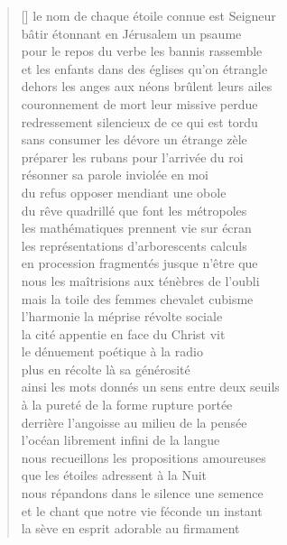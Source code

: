 \documentclass[a4paper, titlepage, twoside, 12pt]{book}
\begin{document}
\begin{verse}[\versewidth]
le nom de chaque étoile connue est Seigneur\\
bâtir étonnant en Jérusalem un psaume\\
pour le repos du verbe les bannis rassemble\\
et les enfants dans des églises qu'on étrangle\\
dehors les anges aux néons brûlent leurs ailes\\
couronnement de mort leur missive perdue\\
redressement silencieux de ce qui est tordu\\
sans consumer les dévore un étrange zèle\\
préparer les rubans pour l'arrivée du roi\\
résonner sa parole inviolée en moi\\
du refus opposer mendiant une obole\\
du rêve quadrillé que font les métropoles\\
les mathématiques prennent vie sur écran\\
les représentations d'arborescents calculs\\
en procession fragmentés jusque n'être que\\
nous les maîtrisions aux ténèbres de l'oubli\\
mais la toile des femmes chevalet cubisme\\
l'harmonie la méprise révolte sociale\\
la cité appentie en face du Christ vit\\
le dénuement poétique à la radio\\
plus en récolte là sa générosité\\
ainsi les mots donnés un sens entre deux seuils\\
à la pureté de la forme rupture portée\\
derrière l'angoisse au milieu de la pensée\\
l'océan librement infini de la langue\\
nous recueillons les propositions amoureuses\\
que les étoiles adressent à la Nuit\\
nous répandons dans le silence une semence\\
et le chant que notre vie féconde un instant\\
la sève en esprit adorable au firmament

\end{verse}
\newpage
\end{document}
